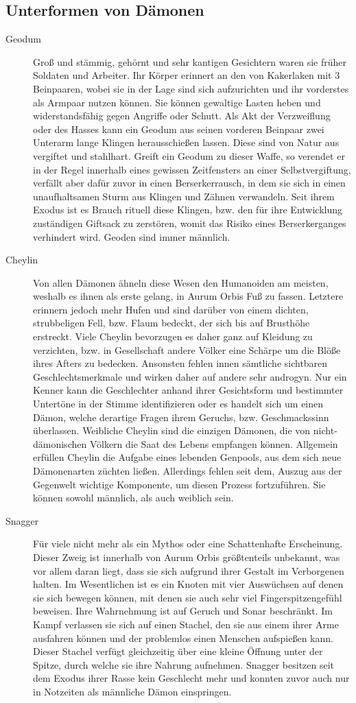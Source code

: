 \documentclass[a4paper,12pt,oneside]{book}
\begin{document}
\subsection{Unterformen von Dämonen}
\begin{description}
\item[Geodum]Groß und stämmig, gehörnt und sehr kantigen Gesichtern waren sie früher Soldaten und Arbeiter. Ihr Körper erinnert an den von Kakerlaken mit 3 Beinpaaren, wobei sie in der Lage sind sich aufzurichten und ihr vorderstes als Armpaar nutzen können. Sie können gewaltige Lasten heben und widerstandsfähig gegen Angriffe oder Schutt. Als Akt der Verzweiflung oder des Hasses kann ein Geodum aus seinen vorderen Beinpaar zwei Unterarm lange Klingen herausschießen lassen. Diese sind von Natur aus vergiftet und stahlhart. Greift ein Geodum zu dieser Waffe, so verendet er in der Regel innerhalb eines gewissen Zeitfensters an einer Selbstvergiftung, verfällt aber dafür zuvor in einen Berserkerrausch, in dem sie sich in einen unaufhaltsamen Sturm aus Klingen und Zähnen verwandeln. Seit ihrem Exodus ist es Brauch rituell diese Klingen, bzw. den für ihre Entwicklung zuständigen Giftsack zu zerstören, womit das Risiko eines Berserkerganges verhindert wird. Geoden sind immer männlich.
\item[Cheylin]Von allen Dämonen ähneln diese Wesen den Humanoiden am meisten, weshalb es ihnen als erste gelang, in Aurum Orbis Fuß zu fassen. Letztere erinnern jedoch mehr Hufen und sind darüber von einem dichten, strubbeligen Fell, bzw. Flaum bedeckt, der sich bis auf Brusthöhe erstreckt. Viele Cheylin bevorzugen es daher ganz auf Kleidung zu verzichten, bzw. in Gesellschaft andere Völker eine Schärpe um die Blöße ihres Afters zu bedecken. Ansonsten fehlen innen sämtliche sichtbaren Geschlechtsmerkmale und wirken daher auf andere sehr androgyn. Nur ein Kenner kann die Geschlechter anhand ihrer Gesichtsform und bestimmter Untertöne in der Stimme identifizieren oder es handelt sich um einen Dämon, welche derartige Fragen ihrem Geruchs, bzw. Geschmackssinn überlassen. Weibliche Cheylin sind die einzigen Dämonen, die von nicht-dämonischen Völkern die Saat des Lebens empfangen können. Allgemein erfüllen Cheylin die Aufgabe eines lebenden Genpools, aus dem sich neue Dämonenarten züchten ließen. Allerdings fehlen seit dem, Auszug aus der Gegenwelt wichtige Komponente, um diesen Prozess fortzuführen. Sie können sowohl männlich, als auch weiblich sein.
\item[Snagger]Für viele nicht mehr als ein Mythos oder eine Schattenhafte Erscheinung. Dieser Zweig ist innerhalb von Aurum Orbis größtenteils unbekannt, was vor allem daran liegt, dass sie sich aufgrund ihrer Gestalt im Verborgenen halten. Im Wesentlichen ist es ein Knoten mit vier Auswüchsen auf denen sie sich bewegen können, mit denen sie auch sehr viel Fingerspitzengefühl beweisen. Ihre Wahrnehmung ist auf Geruch und Sonar beschränkt. Im Kampf verlassen sie sich auf einen Stachel, den sie aus einem ihrer Arme ausfahren können und der problemlos einen Menschen aufspießen kann. Dieser Stachel verfügt gleichzeitig über eine kleine Öffnung unter der Spitze, durch welche sie ihre Nahrung aufnehmen. Snagger besitzen seit dem Exodus ihrer Rasse kein Geschlecht mehr und konnten zuvor auch nur in Notzeiten als männliche Dämon einspringen.

\end{description}
\end{document}
